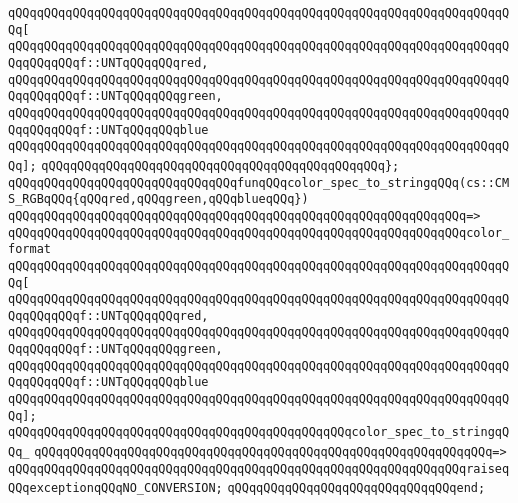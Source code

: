 \verb|qQQqqQQqqQQqqQQqqQQqqQQqqQQqqQQqqQQqqQQqqQQqqQQqqQQqqQQqqQQqqQQqqQQqqQQq[|\newline
\verb|qQQqqQQqqQQqqQQqqQQqqQQqqQQqqQQqqQQqqQQqqQQqqQQqqQQqqQQqqQQqqQQqqQQqqQQqqQQqqQQqf::UNTqQQqqQQqred,|\newline
\verb|qQQqqQQqqQQqqQQqqQQqqQQqqQQqqQQqqQQqqQQqqQQqqQQqqQQqqQQqqQQqqQQqqQQqqQQqqQQqqQQqf::UNTqQQqqQQqgreen,|\newline
\verb|qQQqqQQqqQQqqQQqqQQqqQQqqQQqqQQqqQQqqQQqqQQqqQQqqQQqqQQqqQQqqQQqqQQqqQQqqQQqqQQqf::UNTqQQqqQQqblue|\newline
\verb|qQQqqQQqqQQqqQQqqQQqqQQqqQQqqQQqqQQqqQQqqQQqqQQqqQQqqQQqqQQqqQQqqQQqqQQq];|\newline
\verb|qQQqqQQqqQQqqQQqqQQqqQQqqQQqqQQqqQQqqQQqqQQqqQQq};|\newline
\newline
\verb|qQQqqQQqqQQqqQQqqQQqqQQqqQQqqQQqfunqQQqcolor_spec_to_stringqQQq(cs::CMS_RGBqQQq{qQQqred,qQQqgreen,qQQqblueqQQq})|\newline
\verb|qQQqqQQqqQQqqQQqqQQqqQQqqQQqqQQqqQQqqQQqqQQqqQQqqQQqqQQqqQQqqQQq=>|\newline
\verb|qQQqqQQqqQQqqQQqqQQqqQQqqQQqqQQqqQQqqQQqqQQqqQQqqQQqqQQqqQQqqQQqcolor_format|\newline
\verb|qQQqqQQqqQQqqQQqqQQqqQQqqQQqqQQqqQQqqQQqqQQqqQQqqQQqqQQqqQQqqQQqqQQqqQQq[|\newline
\verb|qQQqqQQqqQQqqQQqqQQqqQQqqQQqqQQqqQQqqQQqqQQqqQQqqQQqqQQqqQQqqQQqqQQqqQQqqQQqqQQqf::UNTqQQqqQQqred,|\newline
\verb|qQQqqQQqqQQqqQQqqQQqqQQqqQQqqQQqqQQqqQQqqQQqqQQqqQQqqQQqqQQqqQQqqQQqqQQqqQQqqQQqf::UNTqQQqqQQqgreen,|\newline
\verb|qQQqqQQqqQQqqQQqqQQqqQQqqQQqqQQqqQQqqQQqqQQqqQQqqQQqqQQqqQQqqQQqqQQqqQQqqQQqqQQqf::UNTqQQqqQQqblue|\newline
\verb|qQQqqQQqqQQqqQQqqQQqqQQqqQQqqQQqqQQqqQQqqQQqqQQqqQQqqQQqqQQqqQQqqQQqqQQq];|\newline
\newline
\verb|qQQqqQQqqQQqqQQqqQQqqQQqqQQqqQQqqQQqqQQqqQQqqQQqcolor_spec_to_stringqQQq_|\newline
\verb|qQQqqQQqqQQqqQQqqQQqqQQqqQQqqQQqqQQqqQQqqQQqqQQqqQQqqQQqqQQqqQQq=>|\newline
\verb|qQQqqQQqqQQqqQQqqQQqqQQqqQQqqQQqqQQqqQQqqQQqqQQqqQQqqQQqqQQqqQQqraiseqQQqexceptionqQQqNO_CONVERSION;|\newline
\verb|qQQqqQQqqQQqqQQqqQQqqQQqqQQqqQQqend;|\newline
\newline
